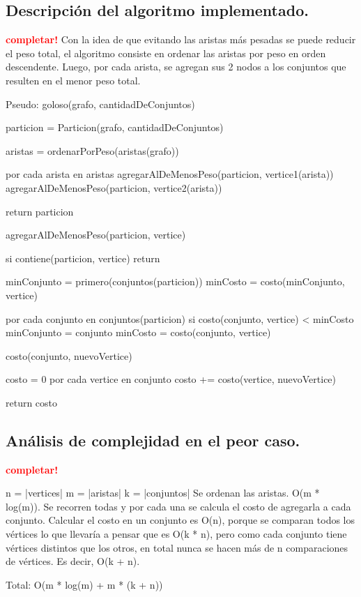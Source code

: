 \subsection{Descripción del algoritmo implementado.}
\vspace*{0.3cm}
\textcolor{red}{\textbf{completar!}}
Con la idea de que evitando las aristas más pesadas se puede reducir el peso total, el algoritmo consiste en ordenar las aristas por peso en orden descendente.
Luego, por cada arista, se agregan sus 2 nodos a los conjuntos que resulten en el menor peso total.

Pseudo:
goloso(grafo, cantidadDeConjuntos) {
	particion = Particion(grafo, cantidadDeConjuntos)

	aristas = ordenarPorPeso(aristas(grafo))

	por cada arista en aristas {
		agregarAlDeMenosPeso(particion, vertice1(arista))
		agregarAlDeMenosPeso(particion, vertice2(arista))
	}

	return particion
}

agregarAlDeMenosPeso(particion, vertice) {
	si contiene(particion, vertice)
		return

	minConjunto = primero(conjuntos(particion))
	minCosto = costo(minConjunto, vertice)

	por cada conjunto en conjuntos(particion) {
		si costo(conjunto, vertice) < minCosto {
			minConjunto = conjunto
			minCosto = costo(conjunto, vertice)
		}
	}
}

costo(conjunto, nuevoVertice) {
	costo = 0
	por cada vertice en conjunto {
		costo += costo(vertice, nuevoVertice)
	}

	return costo
}


\newpage
\subsection{Análisis de complejidad en el peor caso.}
\vspace*{0.3cm}
\textcolor{red}{\textbf{completar!}}

n = |vertices|
m = |aristas|
k = |conjuntos|
Se ordenan las aristas. O(m * log(m)).
Se recorren todas y por cada una se calcula el costo de agregarla a cada conjunto.
Calcular el costo en un conjunto es O(n), porque se comparan todos los vértices lo que llevaría a pensar que es O(k * n), pero como cada conjunto tiene vértices distintos que los otros, en total nunca se hacen más de n comparaciones de vértices. Es decir, O(k + n).

Total: O(m * log(m) + m * (k + n))

